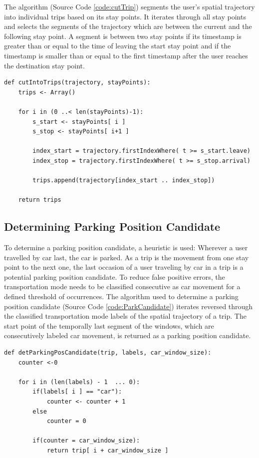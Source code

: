 The algorithm (Source Code \ref{code:cutTrip}) segments the user's spatial trajectory into individual trips based on its stay points. It iterates through all stay points and selects the segments of the trajectory which are between the current and the following stay point. A segment is between two stay points if its timestamp is greater than or equal to the time of leaving the start stay point and if the timestamp is smaller than or equal to the first timestamp after the user reaches the destination stay point. 

\begin{lstlisting}[style=py, caption={Pseudocode: Determine Trips in a Trajectory}, label={code:cutTrip}]
def cutIntoTrips(trajectory, stayPoints):
    trips <- Array()
    
    for i in (0 ..< len(stayPoints)-1):
        s_start <- stayPoints[ i ]
        s_stop <- stayPoints[ i+1 ]
        
        index_start = trajectory.firstIndexWhere( t >= s_start.leave)
        index_stop = trajectory.firstIndexWhere( t >= s_stop.arrival)
        
        trips.append(trajectory[index_start .. index_stop])
    
    return trips
\end{lstlisting}


\subsection{Determining Parking Position Candidate}

To determine a parking position candidate, a heuristic is used: Wherever a user travelled by car last, the car is parked. As a trip is the movement from one stay point to the next one, the last occasion of a user traveling by car in a trip is a potential parking position candidate. To reduce false positive errors, the transportation mode needs to be classified consecutive as car movement for a defined threshold of occurrences. The algorithm used to determine a parking position candidate (Source Code \ref{code:ParkCandidate}) iterates reversed through the classified transportation mode labels of the spatial trajectory of a trip. The start point of the temporally last segment of the windows, which are consecutively labeled car movement, is returned as a parking position candidate. 

\begin{lstlisting}[style=py, caption={Pseudocode: Determine Parking Position Candidate}, label={code:ParkCandidate}]
def detParkingPosCandidate(trip, labels, car_window_size):
    counter <-0
    
    for i in (len(labels) - 1  ... 0):
        if(labels[ i ] == "car"):
            counter <- counter + 1
        else
            counter = 0
        
        if(counter = car_window_size):
            return trip[ i + car_window_size ]
   
\end{lstlisting}

